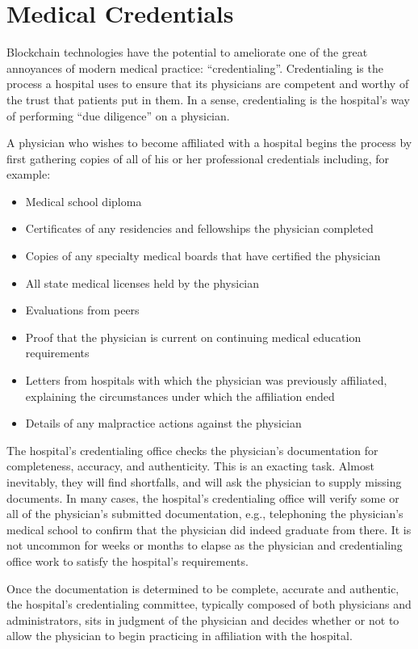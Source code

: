 \section{Medical Credentials}

Blockchain technologies have the potential to ameliorate one of the great annoyances of modern
medical practice: ``credentialing''. Credentialing is the process a hospital uses to ensure that
its physicians are competent and worthy of the trust that patients put in them. In a sense,
credentialing is the hospital's way of performing ``due diligence'' on a physician.

A physician who wishes to become affiliated with a hospital begins the process by first gathering
copies of all of his or her professional credentials including, for example:

\begin{itemize}
\item Medical school diploma
\item Certificates of any residencies and fellowships the physician completed
\item Copies of any specialty medical boards that have certified the physician
\item All state medical licenses held by the physician
\item Evaluations from peers
\item Proof that the physician is current on continuing medical education requirements
\item Letters from hospitals with which the physician was previously affiliated, explaining the
  circumstances under which the affiliation ended 
\item Details of any malpractice actions against the physician
\end{itemize}

The hospital's credentialing office checks the physician's documentation for completeness, accuracy,
and authenticity. This is an exacting task.  Almost inevitably, they will find shortfalls, and will
ask the physician to supply missing documents. In many cases, the hospital's credentialing office
will verify some or all of the physician's submitted documentation, e.g., telephoning the
physician's medical school to confirm that the physician did indeed graduate from there.  It is not
uncommon for weeks or months to elapse as the physician and credentialing office work to satisfy the
hospital's requirements.

Once the documentation is determined to be complete, accurate and authentic, the hospital's
credentialing committee, typically composed of both physicians and administrators, sits in judgment
of the physician and decides whether or not to allow the physician to begin practicing in
affiliation with the hospital.


